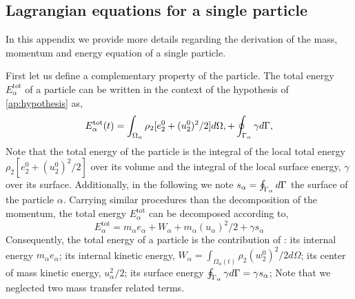 \subsection{Lagrangian equations for a single particle}
\label{ap:particles_eq}
In this appendix we provide more details regarding the derivation of the mass, momentum and energy equation of a single particle. 

First let us define a complementary property of the particle. 
The total energy $E_\alpha^\text{tot}$ of a particle can be written in the context of the hypothesis of \ref{ap:hypothesis} as, 
\begin{equation*}    
     E_\alpha^\text{tot}(t) 
    = \int_{\Omega_\alpha}  \rho_2 [e_2^0 + (u_2^0)^2/2]  d\Omega,
    + \oint_{\Gamma_\alpha}  \gamma  d\Gamma,
\end{equation*}
Note that the total energy of the particle is the integral of the local total energy $\rho_2 [e_2^0 + (u_2^0)^2/2]$ over its volume and the integral of the local surface energy, $\gamma$ over its surface. 
Additionally, in the following we note $s_\alpha = \oint_{\Gamma_\alpha}  d\Gamma$ the surface of the particle $\alpha$. 
Carrying similar procedures than the decomposition of the momentum, the total energy $E_\alpha^\text{tot}$ can be decomposed according to,
\begin{equation*}
    \label{eq:E_alpha_def}
    E_\alpha^\text{tot}
    = m_\alpha e_\alpha 
    + W_\alpha
    + m_\alpha (u_\alpha)^2/2
    + \gamma s_\alpha 
\end{equation*}
Consequently, the total energy of a particle is the contribution of :
its internal energy $m_\alpha e_\alpha$; 
its internal kinetic energy, $W_\alpha = \int_{\Omega_\alpha(t)} \rho_2  (w_2^0)^2/2 d\Omega$;
its center of mass kinetic energy, $u_\alpha^2/2$; 
its surface energy $\oint_{\Gamma_\alpha}  \gamma d\Gamma = \gamma s_\alpha$; 
Note that we neglected two mass transfer related terms. 

